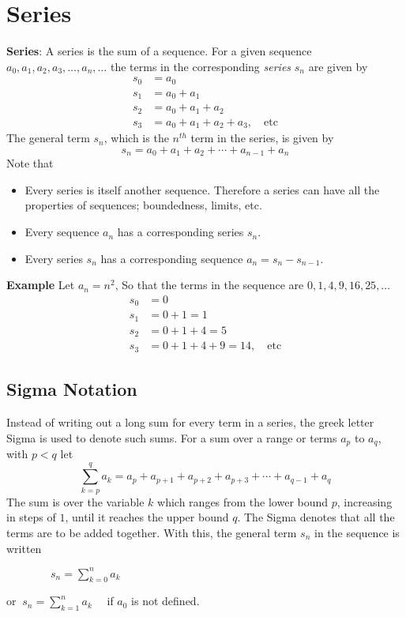 
\section*{Series}



\noindent \textbf{Series}: A series is the sum of a sequence. For a given sequence $a_0,a_1,a_2,a_3,\ldots,a_n,\ldots$ the terms in the corresponding \emph{series} $s_n$ are given by
\begin{align*}
  s_0&=a_0\\
  s_1&=a_0+a_1\\
  s_2&=a_0+a_1+a_2\\
  s_3&=a_0+a_1+a_2+a_3,\quad \text{etc}
\end{align*}
The general term $s_n$, which is the $n^{th}$ term in the series, is given by
\begin{equation*}
  s_n=a_0+a_1+a_2+\cdots+a_{n-1}+a_n
\end{equation*}
Note that
\begin{itemize}
\item Every series is itself another sequence. Therefore a series can have all the properties of sequences; boundedness, limits, etc.
\item Every sequence $a_n$ has a corresponding series $s_n$.
\item Every series $s_n$ has a corresponding sequence $a_n=s_n-s_{n-1}$.
\end{itemize}
\noindent  \textbf{Example}
Let $a_n=n^2$, So that the terms in the sequence are $0,1,4,9,16,25,\ldots$
\begin{align*}
  s_0&=0\\
  s_1&=0+1=1\\
  s_2&=0+1+4=5\\
  s_3&=0+1+4+9=14,\quad \text{etc}
\end{align*}

\subsection*{Sigma Notation}
Instead of writing out a long sum for every term in a series, the greek letter Sigma is used to denote such sums. For a sum over a range or terms $a_p$ to $a_q$, with $p<q$ let
\begin{equation*}
  \sum_{k=p}^{q}a_k = a_p+a_{p+1}+a_{p+2}+a_{p+3}+\cdots+a_{q-1}+a_q
\end{equation*}
The sum is over the variable $k$ which ranges from the lower bound $p$, increasing in steps of $1$, until it reaches the upper bound $q$. The Sigma denotes that all the terms are to be added together. With this, the general term $s_n$ in the sequence is written
\begin{multicols}{2}
$\qquad \qquad s_n=\displaystyle \sum_{k=0}^n a_k$
\columnbreak

or $\ s_n=\displaystyle \sum_{k=1}^n a_k\quad $ if $a_0$ is not defined.
\end{multicols}
\pagebreak

